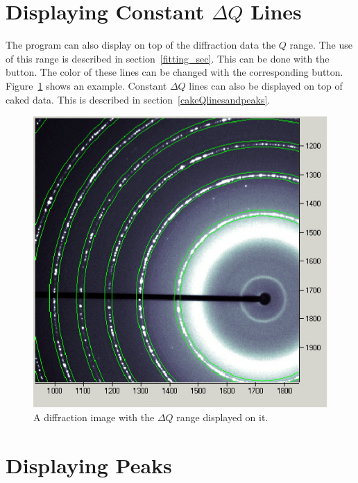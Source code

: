 \section{\texorpdfstring{Displaying Constant $\Delta Q$ 
    Lines}{Displaying Constant delta Q Lines}}
    \label{displayconstdQlines}

The program can also display on top of the diffraction
data the $Q$ range. The use of this range is 
described in section~\ref{fitting_sec}. 
This can be done with the  button.
The color of these lines can be changed with the
corresponding  button. 
Figure~\ref{constant_dq_lines_on_diffraction_image}
shows an example.
Constant $\Delta Q$ lines can also be displayed on top 
of caked data. This is described in 
section~\ref{cakeQlinesandpeaks}.

\begin{figure}
    \centering
    \includegraphics[scale=.75]
    {figures/constant_dq_lines_on_diffraction_image.eps}
    \caption{A diffraction image with the $\Delta Q$ range 
    displayed on it.}
    \label{constant_dq_lines_on_diffraction_image}
\end{figure}

\section{Displaying Peaks}
    \label{displaying_peaks_diffraction}

